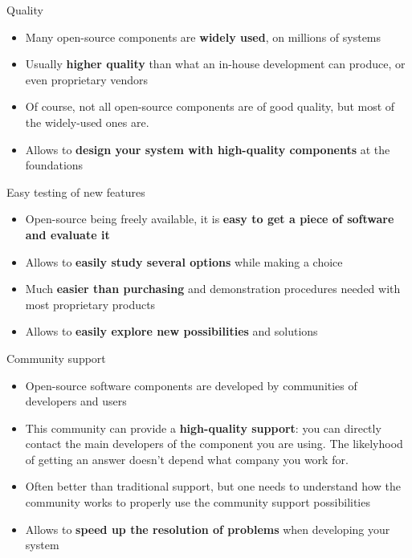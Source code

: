 \begin{frame}{Quality}
    \begin{itemize}
        \item Many open-source components are \textbf{widely used}, on millions of
systems
\item Usually \textbf{higher quality} than what an in-house development can
produce, or even proprietary vendors
\item Of course, not all open-source components are of good
quality, but most of the widely-used ones are.
\item Allows to \textbf{design your system with high-quality
components} at the foundations
    \end{itemize}    
\end{frame}


\begin{frame}{Easy testing of new features}
    \begin{itemize}
        \item Open-source being freely available, it is \textbf{easy to get a piece of
software and evaluate it}
\item Allows to \textbf{easily study several options} while making a choice
\item Much \textbf{easier than purchasing} and demonstration procedures
needed with most proprietary products
\item Allows to \textbf{easily explore new possibilities} and solutions
    \end{itemize}    
\end{frame}


\begin{frame}{Community support}
    \begin{itemize}
        \item Open-source software components are developed by
communities of developers and users
\item This community can provide a \textbf{high-quality support}: you can
directly contact the main developers of the component you
are using. The likelyhood of getting an answer doesn't depend
what company you work for.
\item Often better than traditional support, but one needs to
understand how the community works to properly use the
community support possibilities
\item Allows to \textbf{speed up the resolution of problems} when
developing your system
    \end{itemize}    
\end{frame}


